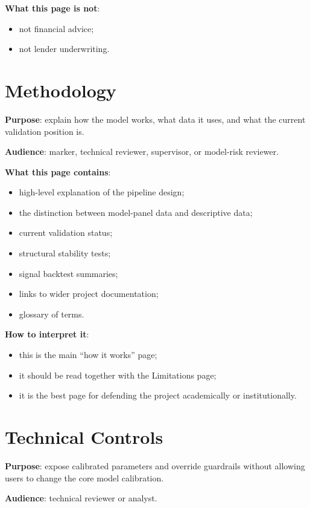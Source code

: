 \documentclass[11pt,a4paper]{article}
\begin{document}
\textbf{What this page is not}:
\begin{itemize}[leftmargin=1.5em]
  \item not financial advice;
  \item not lender underwriting.
\end{itemize}

\section{Methodology}

\textbf{Purpose}: explain how the model works, what data it uses, and what the
current validation position is.

\textbf{Audience}: marker, technical reviewer, supervisor, or model-risk
reviewer.

\textbf{What this page contains}:
\begin{itemize}[leftmargin=1.5em]
  \item high-level explanation of the pipeline design;
  \item the distinction between model-panel data and descriptive data;
  \item current validation status;
  \item structural stability tests;
  \item signal backtest summaries;
  \item links to wider project documentation;
  \item glossary of terms.
\end{itemize}

\textbf{How to interpret it}:
\begin{itemize}[leftmargin=1.5em]
  \item this is the main ``how it works'' page;
  \item it should be read together with the Limitations page;
  \item it is the best page for defending the project academically or institutionally.
\end{itemize}

\section{Technical Controls}

\textbf{Purpose}: expose calibrated parameters and override guardrails without
allowing users to change the core model calibration.

\textbf{Audience}: technical reviewer or analyst.
\end{document}
